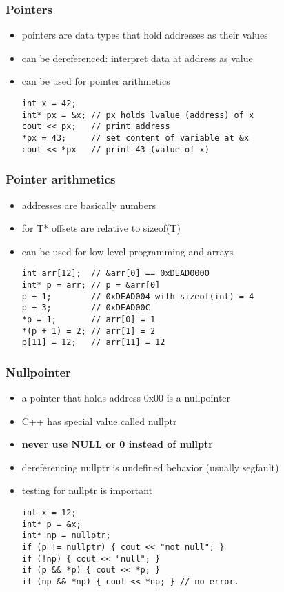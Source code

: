 \begin{frame}[fragile]
    \frametitle{Pointers}
    \begin{itemize}
        \item pointers are data types that hold addresses as their values
        \item can be dereferenced: interpret data at address as value
        \item can be used for pointer arithmetics
        \begin{lstlisting}
int x = 42;
int* px = &x; // px holds lvalue (address) of x
cout << px;   // print address
*px = 43;     // set content of variable at &x
cout << *px   // print 43 (value of x)
        \end{lstlisting}
    \end{itemize}
\end{frame}

\begin{frame}[fragile]
    \frametitle{Pointer arithmetics}
    \begin{itemize}
        \item addresses are basically numbers
        \item for T* offsets are relative to sizeof(T)
        \item can be used for low level programming and arrays
        \begin{lstlisting}
int arr[12];  // &arr[0] == 0xDEAD0000
int* p = arr; // p = &arr[0]
p + 1;        // 0xDEAD004 with sizeof(int) = 4
p + 3;        // 0xDEAD00C
*p = 1;       // arr[0] = 1
*(p + 1) = 2; // arr[1] = 2
p[11] = 12;   // arr[11] = 12
        \end{lstlisting}
    \end{itemize}
\end{frame}

\begin{frame}[fragile]
    \frametitle{Nullpointer}
    \begin{itemize}
        \item a pointer that holds address 0x00 is a nullpointer
        \item C++ has special value called nullptr 
        \item \textbf{never use NULL or 0 instead of nullptr}
        \item dereferencing nullptr is undefined behavior (usually segfault)
        \item testing for nullptr is important
        \begin{lstlisting}
int x = 12;
int* p = &x;
int* np = nullptr;
if (p != nullptr) { cout << "not null"; }
if (!np) { cout << "null"; }
if (p && *p) { cout << *p; }
if (np && *np) { cout << *np; } // no error.
        \end{lstlisting}
    \end{itemize}
\end{frame}



